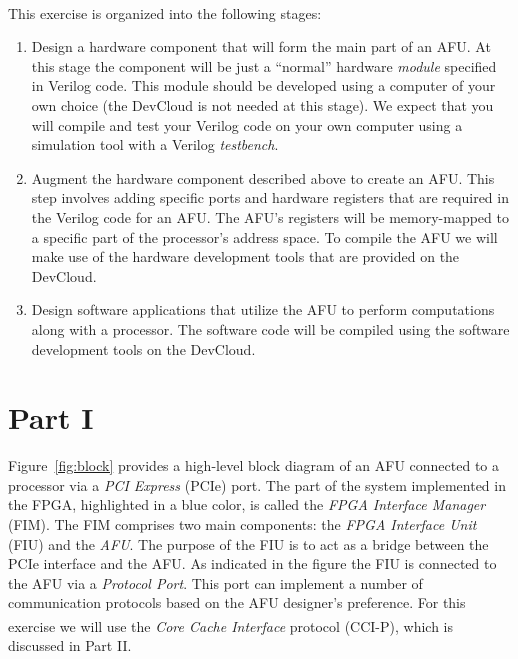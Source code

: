 \documentclass[epsfig,10pt,fullpage]{article}
\begin{document}
~\\
\noindent
This exercise is organized into the following stages:

\begin{enumerate}
\item Design a hardware component that will form the main part of an AFU. At this stage
the component will be just a ``normal'' hardware {\it module} specified in Verilog code. 
This module should be developed using a computer of your own choice (the DevCloud 
is not needed at this stage). We expect that you will compile and test your Verilog code 
on your own computer using a simulation tool with a Verilog {\it testbench}.
\item Augment the hardware component described above to create an AFU. This step involves 
adding specific ports and hardware registers that are required in the Verilog code for an AFU.
The AFU's registers will be memory-mapped to a specific part of the processor's address
space. To compile the AFU we will make use of the hardware development tools that are provided on 
the DevCloud.
\item Design software applications that utilize the AFU to perform computations
along with a processor. The software code will be compiled using the software 
development tools on the DevCloud.
\end{enumerate}

\section*{Part I}
Figure~\ref{fig:block} provides a high-level block diagram of an AFU connected to a 
processor via a {\it PCI Express} (PCIe) port.  The
part of the system implemented in the FPGA, highlighted in a blue color, is called the
{\it FPGA Interface Manager} (FIM). The FIM comprises two main components: the {\it FPGA
Interface Unit} (FIU) and the {\it AFU}. The purpose of the FIU is to act as a bridge
between the PCIe interface and the AFU. As indicated in the figure the FIU is connected to the
AFU via a {\it Protocol Port}. This port can implement a number of
communication protocols based on the AFU designer's preference. For this exercise we will
use the {\it Core Cache Interface} protocol\textsuperscript{\textregistered} (CCI-P), 
which is discussed in Part II. 
\end{document}
